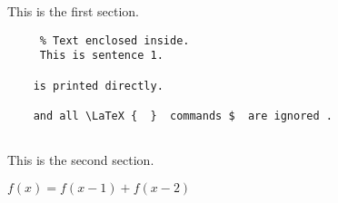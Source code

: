 This is the first section.


\begin{verbatim}
	 % Text enclosed inside.
	 This is sentence 1.
	
	is printed directly.
	 
	and all \LaTeX {  }  commands $  are ignored . 
	
\end{verbatim}

This is the second section.

 $ f ( x )  = f ( x - 1 )  + f ( x - 2 )  $ 




